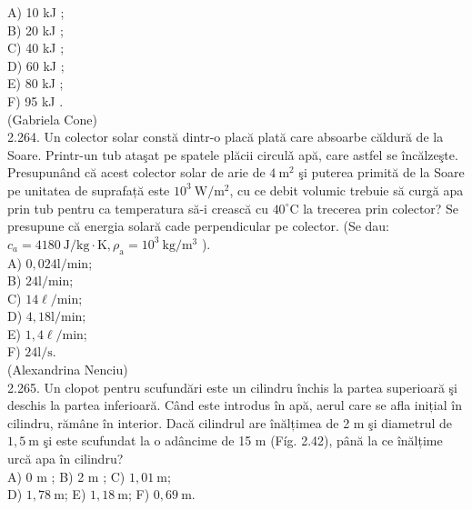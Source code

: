 \documentclass[10pt]{article}
\begin{document}
A) 10 kJ ;\\
B) 20 kJ ;\\
C) 40 kJ ;\\
D) 60 kJ ;\\
E) 80 kJ ;\\
F) 95 kJ .\\
(Gabriela Cone)\\
2.264. Un colector solar constă dintr-o placă plată care absoarbe căldură de la Soare. Printr-un tub ataşat pe spatele plăcii circulǎ apă, care astfel se încălzeşte. Presupunând că acest colector solar de arie de $4 \mathrm{~m}^{2}$ şi puterea primită de la Soare pe unitatea de suprafață este $10^{3} \mathrm{~W} / \mathrm{m}^{2}$, cu ce debit volumic trebuie să curgă apa prin tub pentru ca temperatura să-i crească cu $40^{\circ} \mathrm{C}$ la trecerea prin colector? Se presupune că energia solară cade perpendicular pe colector. (Se dau: $c_{a}=4180 \mathrm{~J} / \mathrm{kg} \cdot \mathrm{K}, \rho_{\mathrm{a}}=10^{3} \mathrm{~kg} / \mathrm{m}^{3}$ ).\\
A) $0,024 \mathrm{l} / \mathrm{min}$;\\
B) $24 \mathrm{l} / \mathrm{min}$;\\
C) $14 \ell / \mathrm{min}$;\\
D) $4,18 \mathrm{l} / \mathrm{min}$;\\
E) $1,4 \ell / \mathrm{min}$;\\
F) $24 \mathrm{l} / \mathrm{s}$.\\
(Alexandrina Nenciu)\\
2.265. Un clopot pentru scufundări este un cilindru închis la partea superioară şi deschis la partea inferioară. Când este introdus în apă, aerul care se afla inițial în cilindru, rămâne în interior. Dacă cilindrul are înălțimea de 2 m şi diametrul de $1,5 \mathrm{~m}$ şi este scufundat la o adâncime de 15 m (Fíg. 2.42), până la ce înălțime urcă apa în cilindru?\\
A) 0 m ; B) 2 m ; C) $1,01 \mathrm{~m}$;\\
D) $1,78 \mathrm{~m}$; E) $1,18 \mathrm{~m}$; F) $0,69 \mathrm{~m}$.\\
\end{document}
